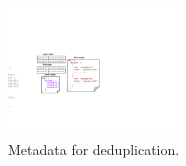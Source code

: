 \begin{figure}[t]
	\centering
			\centering
			\includegraphics[width=0.4\textwidth]{graphs/sift-metadata.pdf}
			\caption{Metadata for deduplication.}
			\label{fig:sift-metadata}
\end{figure}